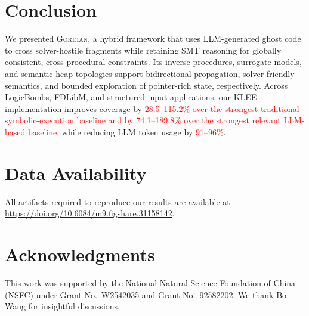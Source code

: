 \documentclass[acmsmall]{acmart}
\newcommand{\rev}[1]{\textcolor{red}{#1}}
\newcommand{\rev}[1]{#1}
\newcommand{\projName}{\textsc{Gordian}\xspace}
\theoremstyle{definition}
\begin{document}

\section{Conclusion}

We presented \projName, a hybrid framework that uses LLM-generated ghost code to cross solver-hostile fragments while retaining SMT reasoning for globally consistent, cross-procedural constraints. Its inverse procedures, surrogate models, and semantic heap topologies support bidirectional propagation, solver-friendly semantics, and bounded exploration of pointer-rich state, respectively. Across LogicBombs, FDLibM, and structured-input applications, our KLEE implementation improves coverage by \rev{28.5--115.2\% over the strongest traditional symbolic-execution baseline and by 74.1--189.8\% over the strongest relevant LLM-based baseline}, while reducing LLM token usage by \rev{91--96\%}.

\section*{Data Availability}

All artifacts required to reproduce our results are available at \url{https://doi.org/10.6084/m9.figshare.31158142}.

\section*{Acknowledgments}
This work was supported by the National Natural Science Foundation of China (NSFC) under Grant No.~W2542035 and Grant No.~92582202. We thank Bo Wang for insightful discussions.






\end{document}
